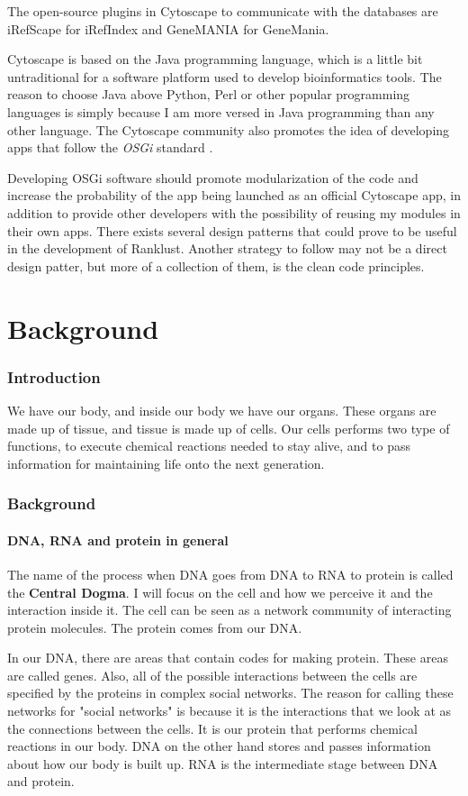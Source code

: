 \documentclass[UKenglish,11pt,twoside,a4paper]{report}
\begin{document}
The open-source plugins in Cytoscape to communicate with the databases are iRefScape \cite{iridb} for iRefIndex and 
GeneMANIA \cite{gmdb} for GeneMania.

Cytoscape is based on the Java programming language, which is a little bit untraditional for a software platform used to
develop bioinformatics tools. %
The reason to choose Java above Python, Perl or other popular programming languages is simply because I am more
versed in Java programming than any other language. The Cytoscape community also promotes the idea of developing apps 
that follow the \emph{OSGi} standard \cite{cytoscape-osgi}.

Developing OSGi software should promote modularization %
of the code and increase the probability of the app being launched as an official Cytoscape app, in addition to provide
other developers with the possibility of reusing my modules in their own apps. There exists several design patterns that
could prove to be useful in the development of Ranklust. Another strategy to follow may not be a direct design patter,
but more of a collection of them, is the clean code principles.
\part{Background}
\section*{Introduction}
We have our body, and inside our body we have our organs. These organs are made up of tissue, and tissue is made up of
cells. Our cells performs two type of functions, to execute chemical reactions needed to stay alive, and to pass
information for maintaining life onto the next generation.
\section*{Background}
\subsection*{DNA, RNA and protein in general}
The name of the process when DNA goes from DNA to RNA to protein is called the \textbf{Central Dogma}. I will focus on
the cell and how we perceive it and the interaction inside it. The cell can be seen as a network community of
interacting protein molecules. The protein comes from our DNA.

In our DNA, there are areas that contain codes for making protein. These areas are called genes. Also, all of the
possible interactions between the cells are specified by the proteins in complex social networks. The reason for calling
these networks for "social networks" is because it is the interactions that we look at as the connections between the
cells. It is our protein that performs chemical reactions in our body. DNA on the other hand stores and passes
information about how our body is built up. RNA is the intermediate stage between DNA and protein.
\end{document}
